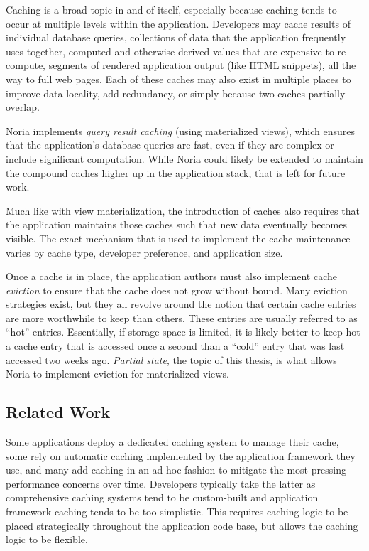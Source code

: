 Caching is a broad topic in and of itself, especially because caching tends to
occur at multiple levels within the application. Developers may cache results of
individual database queries, collections of data that the application frequently
uses together, computed and otherwise derived values that are expensive to
re-compute, segments of rendered application output (like HTML snippets), all
the way to full web pages. Each of these caches may also exist in multiple
places to improve data locality, add redundancy, or simply because two caches
partially overlap.

Noria implements \textit{query result caching} (using materialized views), which
ensures that the application's database queries are fast, even if they are
complex or include significant computation. While Noria could likely be extended
to maintain the compound caches higher up in the application stack, that is left
for future work.

Much like with view materialization, the introduction of caches also requires
that the application maintains those caches such that new data eventually
becomes visible. The exact mechanism that is used to implement the cache
maintenance varies by cache type, developer preference, and application size.

Once a cache is in place, the application authors must also implement cache
\textit{eviction} to ensure that the cache does not grow without bound. Many
eviction strategies exist, but they all revolve around the notion that certain
cache entries are more worthwhile to keep than others. These entries are usually
referred to as ``hot'' entries. Essentially, if storage space is limited, it is
likely better to keep hot a cache entry that is accessed once a second than a
``cold'' entry that was last accessed two weeks ago. \textit{Partial state}, the
topic of this thesis, is what allows Noria to implement eviction for
materialized views.

\subsection{Related Work}

\resume

Some applications deploy a dedicated caching system to manage their cache, some
rely on automatic caching implemented by the application framework they use, and
many add caching in an ad-hoc fashion to mitigate the most pressing performance
concerns over time. Developers typically take the latter as comprehensive
caching systems tend to be custom-built and application framework caching tends
to be too simplistic. This requires caching logic to be placed strategically
throughout the application code base, but allows the caching logic to be
flexible.

